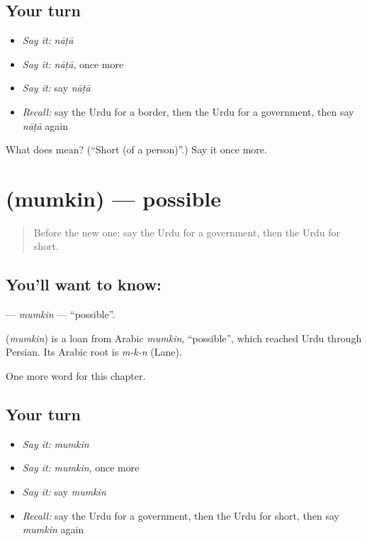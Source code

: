\subsection*{Your turn}
\begin{itemize}
\raggedright
  \item \emph{Say it:} \emph{nāṭā}
  \item \emph{Say it:} \emph{nāṭā}, once more
  \item \emph{Say it:} say \emph{nāṭā}
  \item \emph{Recall:} say the Urdu for a border, then the Urdu for a government, then say \emph{nāṭā} again
\end{itemize}

\begin{tcolorbox}[breakable,colback=teal!4,colframe=teal!35!black,title={Before you move on}]
What does  mean? (\textquotedblleft{}Short (of a person)\textquotedblright{}.) Say it once more.
\end{tcolorbox}
\section[\texorpdfstring{\ur{ممکن} (mumkin)}{ممکن (mumkin)}]{ (mumkin) — possible}

\label{lesson:UR-C247-mumkin}



\begin{quote}
Before the new one: say the Urdu for a government, then the Urdu for short.
\end{quote}

\subsection*{You'll want to know: }
\textbf{} — \emph{mumkin} — \textquotedblleft{}possible\textquotedblright{}.

\begin{cousinweb}
\textbf{} (\emph{mumkin}) is a loan from Arabic \emph{mumkin}, \textquotedblleft{}possible\textquotedblright{}, which reached Urdu through Persian. Its Arabic root is \emph{m-k-n} (Lane).
\end{cousinweb}

\begin{grammarlens}[title={What you've built}]
One more word for this chapter.
\end{grammarlens}

\subsection*{Your turn}
\begin{itemize}
\raggedright
  \item \emph{Say it:} \emph{mumkin}
  \item \emph{Say it:} \emph{mumkin}, once more
  \item \emph{Say it:} say \emph{mumkin}
  \item \emph{Recall:} say the Urdu for a government, then the Urdu for short, then say \emph{mumkin} again
\end{itemize}

